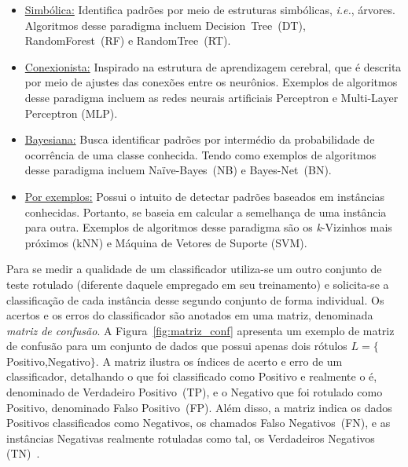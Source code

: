 \begin{itemize}

    \item \underline{Simbólica:} Identifica padrões por meio de estruturas simbólicas, \textit{i.e.}, árvores.
    Algoritmos desse paradigma incluem Decision~Tree~(DT), RandomForest~(RF) e RandomTree~(RT).
    
    \item \underline{Conexionista:}
    Inspirado na estrutura de aprendizagem cerebral, que é descrita por meio de ajustes das conexões entre os neurônios.
    Exemplos de algoritmos desse paradigma incluem as redes neurais artificiais Perceptron e Multi-Layer Perceptron (MLP).

    \item \underline{Bayesiana:} Busca identificar padrões por intermédio da probabilidade de ocorrência de uma classe conhecida.
    Tendo como exemplos de algoritmos desse paradigma incluem Na\"{i}ve-Bayes~(NB) e Bayes-Net~(BN).
    
    \item \underline{Por exemplos:} Possui o intuito de detectar padrões baseados em instâncias conhecidas. 
    Portanto, se baseia em calcular a semelhança de uma instância para outra.
    Exemplos de algoritmos desse paradigma são os \textit{k}-Vizinhos mais próximos (kNN) e Máquina de Vetores de Suporte (SVM).
\end{itemize}

Para se medir a qualidade de um classificador utiliza-se um outro conjunto de teste rotulado (diferente daquele empregado em seu treinamento) e solicita-se a classificação de cada instância desse segundo conjunto de forma individual.
Os acertos e os erros do classificador são anotados em uma matriz, denominada \textit{matriz de confusão}.
A Figura~\ref{fig:matriz_conf} apresenta um exemplo de matriz de confusão para um conjunto de dados que possui apenas dois rótulos $L = \{$Positivo,Negativo$\}$.
A matriz ilustra os índices de acerto e erro de um classificador, detalhando o que foi classificado como Positivo e realmente o é, denominado de Verdadeiro Positivo~(TP), e o Negativo que foi rotulado como Positivo, denominado Falso Positivo~(FP).
Além disso, a matriz indica os dados Positivos classificados como Negativos, os chamados Falso Negativos~(FN), e as instâncias Negativas realmente rotuladas como tal, os Verdadeiros Negativos (TN)~\cite{Townsend1971,Faceli2008,Aggarwal2015}.  

